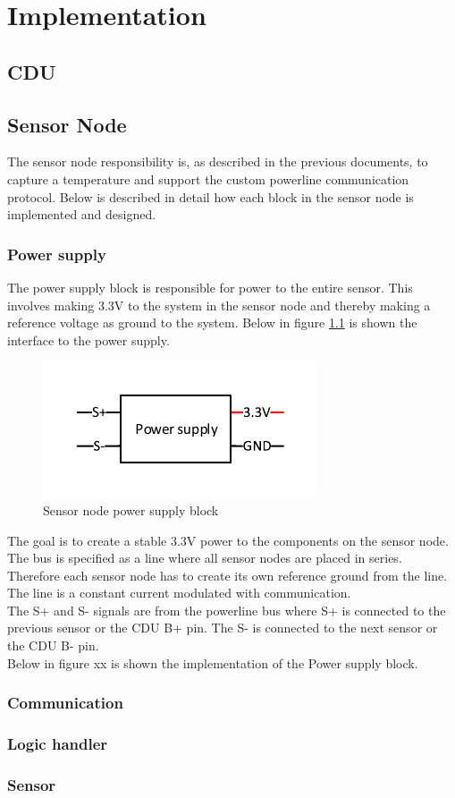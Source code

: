 \chapter{Implementation}
\section{CDU}

\section{Sensor Node}
The sensor node responsibility is, as described in the previous documents, to capture a temperature and support the custom powerline communication protocol. Below is described in detail how each block in the sensor node is implemented and designed.

\subsection{Power supply}
The power supply block is responsible for power to the entire sensor. This involves making 3.3V to the system in the sensor node and thereby making a reference voltage as ground to the system. Below in figure \ref{fig:SN_PS_FIGURE} is shown the interface to the power supply.
\begin{figure}[H]
\centering
\includegraphics[width=.5\textwidth]{billeder/sn_powersupply_figure}
\caption{Sensor node power supply block}
\label{fig:SN_PS_FIGURE}
\end{figure} 
The goal is to create a stable 3.3V power to the components on the sensor node. The bus is specified as a line where all sensor nodes are placed in series. Therefore each sensor node has to create its own reference ground from the line. The line is a constant current modulated with communication.\\
The S+ and S- signals are from the powerline bus where S+ is connected to the previous sensor or the CDU B+ pin. The S- is connected to the next sensor or the CDU B- pin.\\
Below in figure xx is shown the implementation of the Power supply block.




\subsection{Communication}




\subsection{Logic handler}

\subsection{Sensor}